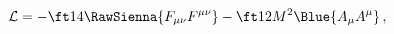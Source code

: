 \begin{equation}
  {\cal L}=-\ft14 \RawSienna{F_{\mu \nu }F^{\mu \nu }}-\ft12M^2\Blue{A_\mu
  A^\mu}\,,
 \label{Lmassive1}
\end{equation}

